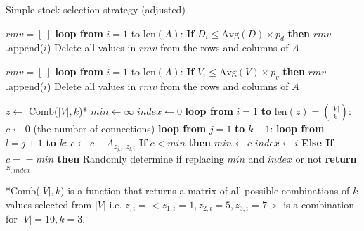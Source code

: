 \tablespacing
\begin{algorithm}[H]
	\caption{Simple stock selection strategy 
	(adjusted)}\label{alg:usage:stockselection2}
	\begin{algorithmic}[1]
		
		\State $rmv = [\ ]$
		\State \textbf{loop from} $i = 1$ to $\text{len}(A)$:
		\State \indent \textbf{If} $D_i \leq \text{Avg}(D) \times p_d$ 
		\textbf{then} 
		$rmv$.append($i$)
		\State Delete all values in $rmv$ from the rows and columns of $A$
		\EndFunction
		
		\State $rmv = [\ ]$
		\State \textbf{loop from} $i = 1$ to $\text{len}(A)$:
		\State \indent \textbf{If} $V_i \leq \text{Avg}(V) \times p_v$ 
		\textbf{then} 
		$rmv$.append($i$)
		\State Delete all values in $rmv$ from the rows and columns of $A$
		\EndFunction

		\State $z \gets$ Comb($|V|,k$)*
		\State $min \gets \infty$
		\State $index \gets 0$
		\State \textbf{loop from} $i=1$ \textbf{to} $\text{len}(z) = 
		{|V| \choose k}$:
		\State \indent $c \gets 0$ (the number of connections)
		\State \indent \textbf{loop from} $j = 1$ \textbf{to} $k-1$:
		\State \indent \indent \textbf{loop from} $l=j+1$ \textbf{to} $k$:
		\State \indent \indent \indent $c \gets c+A_{z_{j,i},z_{l,i}}$
		\State \indent \textbf{If} $c < min$ \textbf{then}
		\State \indent \indent $min \gets c$
		\State \indent \indent $index \gets i$
		\State \indent \textbf{Else If} $c == min$ \textbf{then}
		\State \indent \indent Randomly determine if replacing $min$ and 
		$index$ or not
		\State \textbf{return} $z_{,index}$
		\EndFunction
		\EndProcedure
	\end{algorithmic}
	*Comb($|V|,k$) is a function that returns a matrix of all possible 
	combinations of $k$ values selected from $|V|$ i.e. $z_{,i}=<z_{1,i} = 1, 
	z_{2,i} = 5, z_{3,i} = 7>$ is a combination for $|V|=10,k=3$.
\end{algorithm}
\bodyspacing